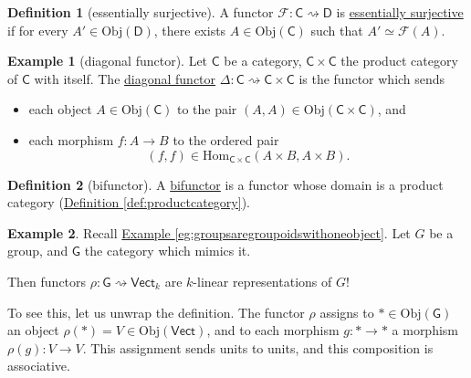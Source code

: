 \documentclass[a4paper]{report}
\newcommand{\defn}[1]{\ul{#1}}
\newcommand{\Obj}{\mathrm{Obj}}
\newcommand{\Hom}{\mathrm{Hom}}
\theoremstyle{definition}
\newtheorem{definition}{Definition}[section]
\newtheorem{example}{Example}[section]
\theoremstyle{plain}
\theoremstyle{remark}
\begin{document}
\begin{definition}[essentially surjective]
  \label{def:essentiallysurjective}
  A functor $\mathcal{F}\colon \mathsf{C} \rightsquigarrow \mathsf{D}$ is \defn{essentially surjective} if for every $A' \in \Obj(\mathsf{D})$, there exists $A \in \Obj(\mathsf{C})$ such that $A' \simeq \mathcal{F}(A)$.
\end{definition}

\begin{example}[diagonal functor]
  \label{eg:diagonalfunctor}
  Let $\mathsf{C}$ be a category, $\mathsf{C} \times \mathsf{C}$ the product category of $\mathsf{C}$ with itself. The \defn{diagonal functor} $\Delta\colon \mathsf{C} \rightsquigarrow \mathsf{C} \times \mathsf{C}$ is the functor which sends 
  \begin{itemize}
    \item each object $A \in \Obj(\mathsf{C})$ to the pair $(A,A) \in \Obj(\mathsf{C} \times \mathsf{C})$, and
    \item each morphism $f\colon A \to B$ to the ordered pair 
      \begin{equation*}
        (f,f) \in \Hom_{\mathsf{C}\times\mathsf{C}}(A\times B,A \times B).
      \end{equation*}
  \end{itemize}
\end{example}

\begin{definition}[bifunctor]
  \label{def:bifunctor}
  A \defn{bifunctor} is a functor whose domain is a product category (\hyperref[def:productcategory]{Definition \ref*{def:productcategory}}).
\end{definition}

\begin{example}
  \label{eg:functorscanbegrouprepresentation}
  Recall \hyperref[eg:groupsaregroupoidswithoneobject]{Example \ref*{eg:groupsaregroupoidswithoneobject}}. Let $G$ be a group, and $\mathsf{G}$ the category which mimics it.

  Then functors $\rho\colon \mathsf{G} \rightsquigarrow \mathsf{Vect}_{k}$ are $k$-linear representations of $G$! 

  To see this, let us unwrap the definition. The functor $\rho$ assigns to $* \in \Obj(\mathsf{G})$ an object $\rho(*) = V \in \Obj(\mathsf{Vect})$, and to each morphism $g\colon * \to *$ a morphism $\rho(g)\colon V \to V$. This assignment sends units to units, and this composition is associative.
\end{example}
\end{document}
